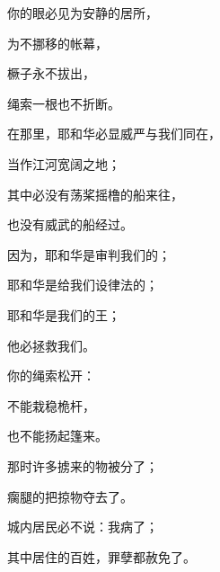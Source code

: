 {\par }{\Q 你的眼必见{}为安静的居所，
\par }{\Q 为不挪移的帐幕，
\par }{\Q 橛子永不拔出，
\par }{\Q 绳索一根也不折断。
\par }{\Q {}在那里，耶和华必显威严与我们同在，
\par }{\Q 当作江河宽阔之地；
\par }{\Q 其中必没有荡桨摇橹的船来往，
\par }{\Q 也没有威武的船经过。
\par }{\Q {}因为，耶和华是审判我们的；
\par }{\Q 耶和华是给我们设律法的；
\par }{\Q 耶和华是我们的王；
\par }{\Q 他必拯救我们。
\par }{\BB \par }{\Q {}你的绳索松开：
\par }{\Q 不能栽稳桅杆，
\par }{\Q 也不能扬起篷来。
\par }{\Q 那时许多掳来的物被分了；
\par }{\Q 瘸腿的把掠物夺去了。
\par }{\Q {}城内居民必不说：我病了；
\par }{\Q 其中居住的百姓，罪孽都赦免了。

}
